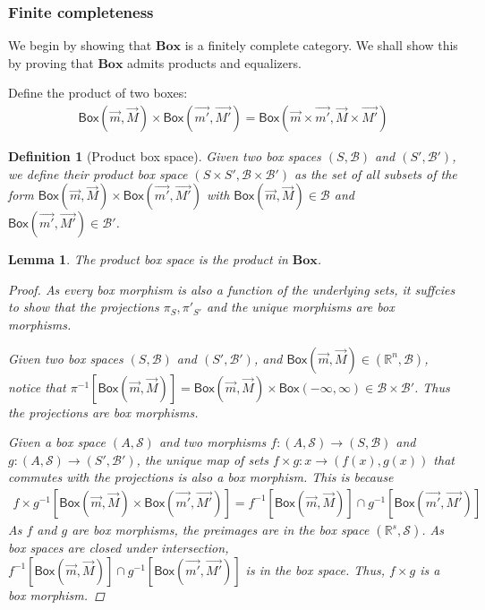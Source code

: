 \documentclass[12pt]{article}
\newtheorem{lemma}[theorem]{Lemma}
\newtheorem{definition}[theorem]{Definition}
\newcommand{\bobject}{\mathsf{Box}}
\begin{document}
\subsubsection{Finite completeness} 
We begin by showing that
$\mathbf{Box}$ is a finitely complete category.
We shall show this 
by proving that $\mathbf{Box}$ admits products and equalizers.
\par Define the product of two boxes:
    \begin{gather*}
        \bobject(\vec{m},\vec{M})\times\bobject(\vec{m'},\vec{M'})=
        \bobject(\vec{m}\times\vec{m'},\vec{M}\times\vec{M'})
    \end{gather*}
\begin{definition}[Product box space]
    Given two box spaces $(S,\mathcal{B})$ and $(S',\mathcal{B}')$,
    we define their product box space 
    $(S\times S',\mathcal{B}\times\mathcal{B}')$ 
    as the set of all subsets of 
    the form
    $\bobject(\vec{m},\vec{M})\times\bobject(\vec{m'},\vec{M'})$
    with $\bobject(\vec{m},\vec{M})\in\mathcal{B}$ 
    and 
    $\bobject(\vec{m'},\vec{M'})\in \mathcal{B}'$.
\end{definition}
\begin{lemma}
    The product box space is the product in $\mathbf{Box}$.
    \begin{proof}
        As every
        box morphism is also a function of the underlying sets,
        it suffcies to show that the
        projections $\pi_{S},\pi'_{S'}$
        and the unique morphisms
        are box morphisms.
        \par Given two box spaces $(S,\mathcal{B})$ and $(S',\mathcal{B}')$,
        and $\bobject(\vec{m},\vec{M})\in(\mathbb{R}^n,\mathcal{B})$, notice that
        $\pi^{-1}[\bobject(\vec{m},\vec{M})]=\bobject(\vec{m},\vec{M})\times\bobject(-\infty,\infty)\in\mathcal{B}\times\mathcal{B}'$.
        Thus the projections are box morphisms.
        \par Given a box space $(A,\mathcal{S})$
        and two morphisms $f:(A,\mathcal{S})\to(S,\mathcal{B})$
        and $g:(A,\mathcal{S})\to(S',\mathcal{B}')$,
        the unique map of sets $f\times g:x\to(f(x),g(x))$ that commutes with the projections is also a box morphism.
        This is because 
        \begin{gather*}
            f\times g^{-1}[\bobject(\vec{m},\vec{M})\times\bobject(\vec{m'},\vec{M'})]=
            f^{-1}[\bobject(\vec{m},\vec{M})]\cap g^{-1}[\bobject(\vec{m'},\vec{M'})]
        \end{gather*}
        As $f$ and $g$ are box morphisms, the preimages are in the box space $(\mathbb{R}^s,\mathcal{S})$.
        As box spaces are closed under intersection, $f^{-1}[\bobject(\vec{m},\vec{M})]\cap g^{-1}[\bobject(\vec{m'},\vec{M'})]$
        is in the box space. Thus, $f\times g$ is a box morphism.
    \end{proof}
\end{lemma}
\end{document}
